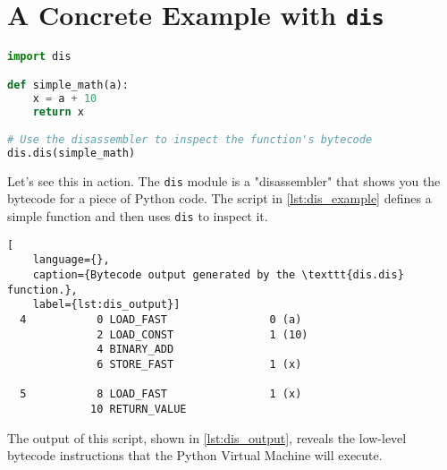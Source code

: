 
\lstset{style=estilo}

\section*{A Concrete Example with \texttt{dis}}

\begin{lstlisting}[language=Python, caption={Python code demonstrating the \texttt{dis} module.}, label={lst:dis_example}
]
import dis

def simple_math(a):
    x = a + 10
    return x

# Use the disassembler to inspect the function's bytecode
dis.dis(simple_math)
\end{lstlisting}

Let's see this in action. The \texttt{dis} module is a "disassembler" that 
shows you the bytecode for a piece of Python code. The script in \autoref{lst:dis_example} defines a simple function and then uses \texttt{dis} to inspect it.

\begin{lstlisting}[
    language={}, 
    caption={Bytecode output generated by the \texttt{dis.dis} function.},
    label={lst:dis_output}]
  4           0 LOAD_FAST                0 (a)
              2 LOAD_CONST               1 (10)
              4 BINARY_ADD
              6 STORE_FAST               1 (x)

  5           8 LOAD_FAST                1 (x)
             10 RETURN_VALUE
\end{lstlisting}

The output of this script, shown in \autoref{lst:dis_output}, reveals the  low-level bytecode instructions that the Python Virtual Machine will execute.

